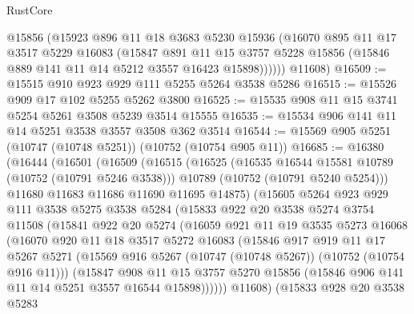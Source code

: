 \begin{lexlean}{RustCore}
\begin{coremodule}
          @15856
          (@15923
            @896
            @11
            @18
            @3683
            @5230
            @15936
            (@16070
              @895
              @11
              @17
              @3517
              @5229
              @16083
              (@15847
                @891
                @11
                @15
                @3757
                @5228
                @15856
                (@15846 @889 @141 @11 @14 @5212 @3557 @16423 @15898))))))
      @11608)
@16509 := @15515 @910 @923 @929 @111 @5255 @5264 @3538 @5286
@16515 := @15526 @909 @17 @102 @5255 @5262 @3800
@16525 := @15535 @908 @11 @15 @3741 @5254 @5261 @3508 @5239 @3514 @15555
@16535 := @15534 @906 @141 @11 @14 @5251 @3538 @3557 @3508 @362 @3514
@16544 := @15569 @905 @5251 (@10747 (@10748 @5251)) (@10752 (@10754 @905 @11))
@16685 := @16380
    (@16444
      (@16501
        (@16509
          (@16515
            (@16525
              (@16535 @16544 @15581 @10789 (@10752 (@10791 @5246 @3538)))
              @10789
              (@10752 (@10791 @5240 @5254)))
            @11680
            @11683
            @11686
            @11690
            @11695
            @14875)
          (@15605
            @5264
            @923
            @929
            @111
            @3538
            @5275
            @3538
            @5284
            (@15833
              @922
              @20
              @3538
              @5274
              @3754
              @11508
              (@15841
                @922
                @20
                @5274
                (@16059
                  @921
                  @11
                  @19
                  @3535
                  @5273
                  @16068
                  (@16070
                    @920
                    @11
                    @18
                    @3517
                    @5272
                    @16083
                    (@15846
                      @917
                      @919
                      @11
                      @17
                      @5267
                      @5271
                      (@15569 @916 @5267 (@10747 (@10748 @5267)) (@10752 (@10754 @916 @11)))
                      (@15847
                        @908
                        @11
                        @15
                        @3757
                        @5270
                        @15856
                        (@15846 @906 @141 @11 @14 @5251 @3557 @16544 @15898))))))
              @11608)
            (@15833
              @928
              @20
              @3538
              @5283

\end{coremodule}
\end{lexlean}
